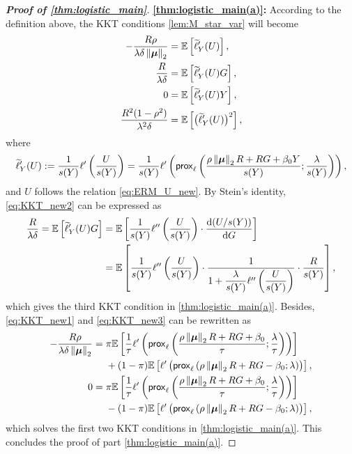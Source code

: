 \begin{proof}[\textbf{Proof of \cref{thm:logistic_main}}]
\vspace{0.5\baselineskip}
\noindent
\textbf{\ref{thm:logistic_main(a)}:} According to the definition above, the KKT conditions \cref{lem:M_star_var} will become
\begin{align}
                - \frac{R \rho}{\lambda \delta \left\|{{\boldsymbol{\mu}}}\right\|_2}
                & = 
                \mathbb{E} \left[ \widetilde\ell'_Y(U) \right],
                \label{eq:KKT_new1}
                \\
                \frac{R}{\lambda \delta }
                & = 
                \mathbb{E} \left[ \widetilde\ell'_Y(U) G \right],
                \label{eq:KKT_new2}
                \\
                0
                & = 
                \mathbb{E} \left[ \widetilde\ell'_Y(U) Y \right],
                \label{eq:KKT_new3}
                \\
                \frac{R^2 (1 - \rho^2)}{\lambda^2 \delta}
                & = 
                \mathbb{E} \left[ \bigl( \widetilde\ell'_Y(U) \bigr)^2 \right],
                \notag
\end{align}
where
\begin{equation*}
    \widetilde\ell'_Y(U) := \frac{1}{s(Y)} \ell'\left( \frac{U}{s(Y)} \right)
    = \frac{1}{s(Y)} \ell'\left( \mathsf{prox}_{\ell}\left( \frac{\rho\left\|{{\boldsymbol{\mu}}}\right\|_2 R + RG + \beta_0 Y}{s(Y)} ; \frac{\lambda}{s(Y)} \right) \right)
    ,
\end{equation*}
and $U$ follows the relation \cref{eq:ERM_U_new}. By Stein's identity, \cref{eq:KKT_new2} can be expressed as
\begin{align*}
    \frac{R}{\lambda \delta } = \mathbb{E} \left[ \widetilde\ell'_Y(U) G \right]
    & = \mathbb{E} \left[ \frac{1}{s(Y)} \ell''\left( \frac{U}{s(Y)} \right)
    \cdot \frac{\textup{d} (U/s(Y))}{\textup{d} G} \right] \\
    & = \mathbb{E} \left[ \frac{1}{s(Y)} \ell''\left( \frac{U}{s(Y)} \right)
    \cdot \frac{1}{1 + \dfrac{\lambda}{s(Y)} \ell''\left( \dfrac{U}{s(Y)} \right) } \cdot \dfrac{R}{s(Y)}  \right],
\end{align*}
which gives the third KKT condition in \ref{thm:logistic_main(a)}. Besides, \cref{eq:KKT_new1} and \ref{eq:KKT_new3} can be rewritten as
\begin{align*}
    - \frac{R \rho}{\lambda \delta \left\|{{\boldsymbol{\mu}}}\right\|_2}
    & = \pi \mathbb{E}\left[ \frac{1}{\tau} \ell'\left( \mathsf{prox}_{\ell}\left( \frac{\rho\left\|{{\boldsymbol{\mu}}}\right\|_2 R + RG + \beta_0}{\tau} ; \frac{\lambda}{\tau} \right) \right) \right] \\
    & \phantom{=.} 
    + (1-\pi) \mathbb{E}\left[ \ell'\, \bigl( \mathsf{prox}_{\ell}\left( \rho\left\|{{\boldsymbol{\mu}}}\right\|_2 R + RG - \beta_0 ; \lambda \right) \bigr)  \right],
    \\
    0 & = \pi \mathbb{E}\left[ \frac{1}{\tau} \ell'\left( \mathsf{prox}_{\ell}\left( \frac{\rho\left\|{{\boldsymbol{\mu}}}\right\|_2 R + RG + \beta_0}{\tau} ; \frac{\lambda}{\tau} \right) \right) \right] \\
    & \phantom{=.}
    - (1-\pi) \mathbb{E}\left[ \ell'\, \bigl( \mathsf{prox}_{\ell}\left( \rho\left\|{{\boldsymbol{\mu}}}\right\|_2 R + RG - \beta_0 ; \lambda \right) \bigr)  \right],
\end{align*}
which solves the first two KKT conditions in \ref{thm:logistic_main(a)}. This concludes the proof of part \ref{thm:logistic_main(a)}.



\end{proof}
